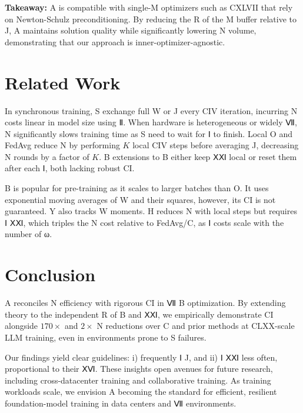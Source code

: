 \documentclass{article}
\begin{document}
\textbf{Takeaway:} A is compatible with single-M optimizers such as CXLVII that rely on Newton-Schulz preconditioning. By reducing the R of the M buffer relative to J, A maintains solution quality while significantly lowering N volume, demonstrating that our approach is inner-optimizer-agnostic.

\section{Related Work}
\label{sec:related}

In synchronous training, S exchange full W or J every CIV iteration, incurring N costs linear in model size using Ⅱ. When hardware is heterogeneous or widely Ⅶ, N significantly slows training time as S need to wait for Ⅰ to finish. Local O and FedAvg reduce N by performing $K$ local CIV steps before averaging J, decreasing N rounds by a factor of $K$. B extensions to B either keep ⅩⅪ local or reset them after each Ⅰ, both lacking robust CI.

B is popular for pre-training as it scales to larger batches than O. It uses exponential moving averages of W and their squares, however, its CI is not guaranteed. Y also tracks W moments. H reduces N with local steps but requires Ⅰ ⅩⅪ, which triples the N cost relative to FedAvg/C, as Ⅰ costs scale with the number of ω.

\section{Conclusion}
\label{sec:conclusion}

A reconciles N efficiency with rigorous CI in Ⅶ B optimization. By extending theory to the independent R of B and ⅩⅪ, we empirically demonstrate CI alongside $170\times$ and $2\times$ N reductions over C and prior methods at CLXX-scale LLM training, even in environments prone to S failures.

Our findings yield clear guidelines: i) frequently Ⅰ J, and ii) Ⅰ ⅩⅪ less often, proportional to their ⅩⅥ. These insights open avenues for future research, including cross-datacenter training and collaborative training. As training workloads scale, we envision A becoming the standard for efficient, resilient foundation-model training in data centers and Ⅶ environments.
\end{document}

